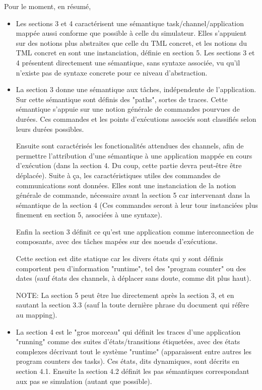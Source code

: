 \documentclass{article}
\begin{document}
Pour le moment, en résumé,
\begin{itemize}
\item Les sections 3 et 4 caractérisent une sémantique task/channel/application mappée aussi conforme que possible à celle du simulateur. Elles s'appuient sur des notions plus abstraites que celle du TML concret, et les notions du TML concret en sont une instanciation, définie en section 5. Les sections 3 et 4 présentent directement une sémantique, sans syntaxe associée, vu qu'il n'existe pas de syntaxe concrete pour ce niveau d'abstraction.
\item La section 3 donne une sémantique aux tâches, indépendente de l'application. Sur cette sémantique sont définis des "paths", sortes de traces. Cette sémantique s'appuie sur une notion générale de commandes pourvues de durées. Ces commandes et les points d'exécutions associés sont classifiés selon leurs durées possibles.

Ensuite sont caractérisés les fonctionalités attendues des channels, afin de permettre l'attribution d'une sémantique à une application mappée en cours d'exécution (dans la section 4. Du coup, cette partie devra peut-être être déplacée). Suite à ça, les caractéristiques utiles des commandes de communications sont données. Elles sont une instanciation de la notion générale de commande, nécessaire avant la section 5 car intervenant dans la sémantique de la section 4 (Ces commandes seront à leur tour instanciées plus finement en section 5, associées à une syntaxe).

Enfin la section 3 définit ce qu'est une application comme interconnection de composants, avec des tâches mapées sur des noeuds d'exécutions. 

Cette section est dite statique car les divers états qui y sont définis comportent peu d'information "runtime", tel des "program counter" ou des dates (sauf états des channels, à déplacer sans doute, comme dit plus haut).

NOTE: La section 5 peut être lue directement après la section 3, et en sautant la section 3.3 (sauf la toute dernière phrase du document qui réfère au mapping).
\item La section 4 est le "gros morceau" qui définit les traces d'une application "running" comme des suites d'états/transitions étiquetées, avec des états complexes décrivant tout le système "runtime" (apparaissent entre autres les program counters des tasks). Ces états, dits dynamiques, sont décrits en section 4.1. Ensuite la section 4.2 définit les pas sémantiques correspondant aux pas se simulation (autant que possible). 


\end{itemize}
\end{document}
